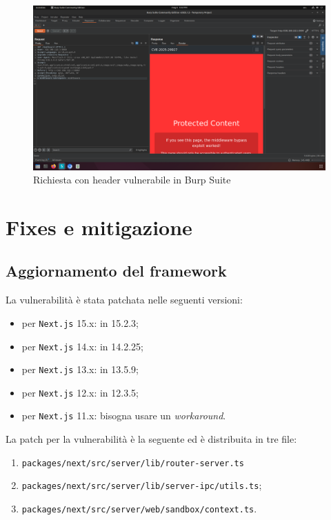 \documentclass[a4paper,oneside,12pt]{report}
\begin{document}
\begin{figure}[H]
	\centering
	\includegraphics[width=\textwidth]{images/burpsuite_exploit_ok.png}
	\caption{Richiesta con header vulnerabile in Burp Suite}
	\label{fig:burpsuite-exploit-ok}
\end{figure}

\chapter{Fixes e mitigazione}
\label{chap:fixes-mitigazione}

\section{Aggiornamento del framework}
\label{sec:aggiornamento-framework}

La vulnerabilit\`a \`e stata patchata nelle seguenti versioni:
\begin{itemize}
	\item per \texttt{Next.js} 15.x: in 15.2.3;
	\item per \texttt{Next.js} 14.x: in 14.2.25;
	\item per \texttt{Next.js} 13.x: in 13.5.9;
	\item per \texttt{Next.js} 12.x: in 12.3.5;
	\item per \texttt{Next.js} 11.x: bisogna usare un \textit{workaround}.
\end{itemize}

La patch per la vulnerabilit\`a \`e la seguente ed \`e distribuita in tre file:
\begin{enumerate}
	\item \texttt{packages/next/src/server/lib/router-server.ts}
	\item \texttt{packages/next/src/server/lib/server-ipc/utils.ts};
	\item \texttt{packages/next/src/server/web/sandbox/context.ts}.
\end{enumerate}
\end{document}
